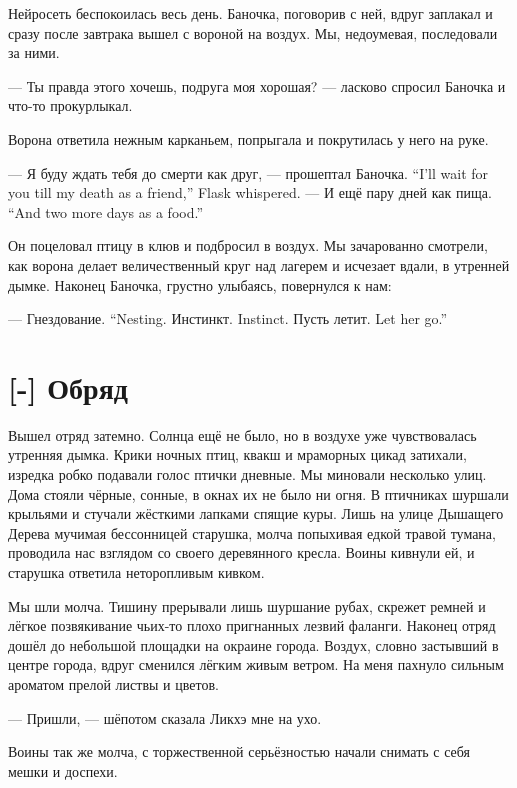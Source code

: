 \textspace

Нейросеть беспокоилась весь день.
Баночка, поговорив с ней, вдруг заплакал и сразу после завтрака вышел с вороной на воздух.
Мы, недоумевая, последовали за ними.

--- Ты правда этого хочешь, подруга моя хорошая? --- ласково спросил Баночка и что-то прокурлыкал.

Ворона ответила нежным карканьем, попрыгала и покрутилась у него на руке.

{--- Я буду ждать тебя до смерти как друг, --- прошептал Баночка.}
{``I'll wait for you till my death as a friend,'' Flask whispered.}
{--- И ещё пару дней как пища.}
{``And two more days as a food.''}

Он поцеловал птицу в клюв и подбросил в воздух.
Мы зачарованно смотрели, как ворона делает величественный круг над лагерем и исчезает вдали, в утренней дымке.
Наконец Баночка, грустно улыбаясь, повернулся к нам:

{--- Гнездование.}
{``Nesting.}
{Инстинкт.}
{Instinct.}
{Пусть летит.}
{Let her go.''}

\section{[-] Обряд}


Вышел отряд затемно.
Солнца ещё не было, но в воздухе уже чувствовалась утренняя дымка.
Крики ночных птиц, квакш и мраморных цикад затихали, изредка робко подавали голос птички дневные.
Мы миновали несколько улиц.
Дома стояли чёрные, сонные, в окнах их не было ни огня.
В птичниках шуршали крыльями и стучали жёсткими лапками спящие куры.
Лишь на улице Дышащего Дерева мучимая бессонницей старушка, молча попыхивая едкой травой тумана, проводила нас взглядом со своего деревянного кресла.
Воины кивнули ей, и старушка ответила неторопливым кивком.

Мы шли молча.
Тишину прерывали лишь шуршание рубах, скрежет ремней и лёгкое позвякивание чьих-то плохо пригнанных лезвий фаланги.
Наконец отряд дошёл до небольшой площадки на окраине города.
Воздух, словно застывший в центре города, вдруг сменился лёгким живым ветром.
На меня пахнуло сильным ароматом прелой листвы и цветов.

--- Пришли, --- шёпотом сказала Ликхэ мне на ухо.

Воины так же молча, с торжественной серьёзностью начали снимать с себя мешки и доспехи.

